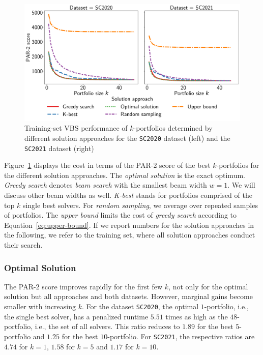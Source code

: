 \documentclass[a4paper,USenglish,pdfa]{lipics-v2021} %
\begin{document}
\begin{figure}[tb]
	\centering
	\includegraphics[width=\columnwidth, trim={0 15 0 0}, clip]{plots/search-train-objective.pdf}
	\caption{Training-set VBS performance of $k$-portfolios determined by different solution approaches for the \texttt{SC2020} dataset (left) and the \texttt{SC2021} dataset (right)}
	\label{fig:search-train-objective}
\end{figure}

Figure~\ref{fig:search-train-objective} displays the cost in terms of the PAR-2 score of the best $k$-portfolios for the different solution approaches. 
The \emph{optimal solution} is the exact optimum.
\emph{Greedy search} denotes \emph{beam search} with the smallest beam width $w=1$. 
We will discuss other beam widths as well.
\emph{K-best} stands for portfolios comprised of the top $k$ single best solvers. 
For \emph{random sampling}, we average over repeated samples of portfolios.
The \emph{upper bound} limits the cost of \emph{greedy search} according to Equation~\ref{eq:upper-bound}.
If we report numbers for the solution approaches in the following, we refer to the training set, where all solution approaches conduct their search.

\subsubsection{Optimal Solution}

The PAR-2 score improves rapidly for the first few $k$, not only for the optimal solution but all approaches and both datasets.
However, marginal gains become smaller with increasing $k$.
For the dataset \texttt{SC2020}, the optimal $1$-portfolio, i.e., the single best solver, has a penalized runtime $5.51$ times as high as the $48$-portfolio, i.e., the set of all solvers.
This ratio reduces to $1.89$ for the best $5$-portfolio and $1.25$ for the best $10$-portfolio.
For \texttt{SC2021}, the respective ratios are $4.74$ for $k=1$, $1.58$ for $k=5$ and $1.17$ for $k=10$.
\end{document}
